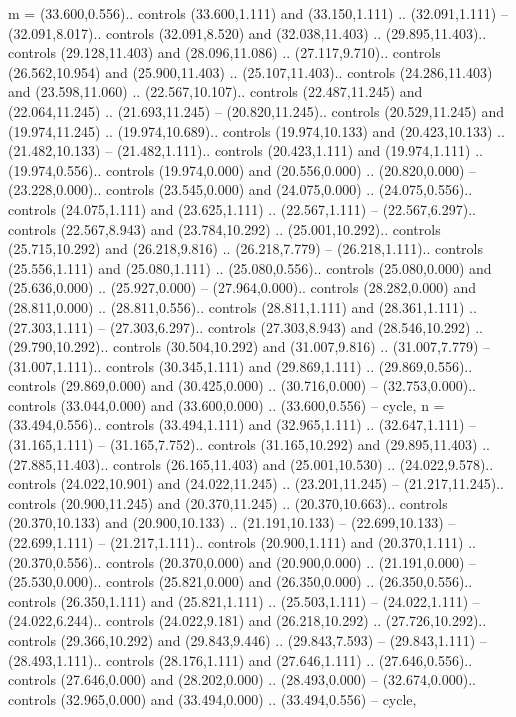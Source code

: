 {m} = {(33.600,0.556).. controls (33.600,1.111) and (33.150,1.111) .. (32.091,1.111) -- (32.091,8.017).. controls (32.091,8.520) and (32.038,11.403) .. (29.895,11.403).. controls (29.128,11.403) and (28.096,11.086) .. (27.117,9.710).. controls (26.562,10.954) and (25.900,11.403) .. (25.107,11.403).. controls (24.286,11.403) and (23.598,11.060) .. (22.567,10.107).. controls (22.487,11.245) and (22.064,11.245) .. (21.693,11.245) -- (20.820,11.245).. controls (20.529,11.245) and (19.974,11.245) .. (19.974,10.689).. controls (19.974,10.133) and (20.423,10.133) .. (21.482,10.133) -- (21.482,1.111).. controls (20.423,1.111) and (19.974,1.111) .. (19.974,0.556).. controls (19.974,0.000) and (20.556,0.000) .. (20.820,0.000) -- (23.228,0.000).. controls (23.545,0.000) and (24.075,0.000) .. (24.075,0.556).. controls (24.075,1.111) and (23.625,1.111) .. (22.567,1.111) -- (22.567,6.297).. controls (22.567,8.943) and (23.784,10.292) .. (25.001,10.292).. controls (25.715,10.292) and (26.218,9.816) .. (26.218,7.779) -- (26.218,1.111).. controls (25.556,1.111) and (25.080,1.111) .. (25.080,0.556).. controls (25.080,0.000) and (25.636,0.000) .. (25.927,0.000) -- (27.964,0.000).. controls (28.282,0.000) and (28.811,0.000) .. (28.811,0.556).. controls (28.811,1.111) and (28.361,1.111) .. (27.303,1.111) -- (27.303,6.297).. controls (27.303,8.943) and (28.546,10.292) .. (29.790,10.292).. controls (30.504,10.292) and (31.007,9.816) .. (31.007,7.779) -- (31.007,1.111).. controls (30.345,1.111) and (29.869,1.111) .. (29.869,0.556).. controls (29.869,0.000) and (30.425,0.000) .. (30.716,0.000) -- (32.753,0.000).. controls (33.044,0.000) and (33.600,0.000) .. (33.600,0.556) -- cycle},
{n} = {(33.494,0.556).. controls (33.494,1.111) and (32.965,1.111) .. (32.647,1.111) -- (31.165,1.111) -- (31.165,7.752).. controls (31.165,10.292) and (29.895,11.403) .. (27.885,11.403).. controls (26.165,11.403) and (25.001,10.530) .. (24.022,9.578).. controls (24.022,10.901) and (24.022,11.245) .. (23.201,11.245) -- (21.217,11.245).. controls (20.900,11.245) and (20.370,11.245) .. (20.370,10.663).. controls (20.370,10.133) and (20.900,10.133) .. (21.191,10.133) -- (22.699,10.133) -- (22.699,1.111) -- (21.217,1.111).. controls (20.900,1.111) and (20.370,1.111) .. (20.370,0.556).. controls (20.370,0.000) and (20.900,0.000) .. (21.191,0.000) -- (25.530,0.000).. controls (25.821,0.000) and (26.350,0.000) .. (26.350,0.556).. controls (26.350,1.111) and (25.821,1.111) .. (25.503,1.111) -- (24.022,1.111) -- (24.022,6.244).. controls (24.022,9.181) and (26.218,10.292) .. (27.726,10.292).. controls (29.366,10.292) and (29.843,9.446) .. (29.843,7.593) -- (29.843,1.111) -- (28.493,1.111).. controls (28.176,1.111) and (27.646,1.111) .. (27.646,0.556).. controls (27.646,0.000) and (28.202,0.000) .. (28.493,0.000) -- (32.674,0.000).. controls (32.965,0.000) and (33.494,0.000) .. (33.494,0.556) -- cycle},
